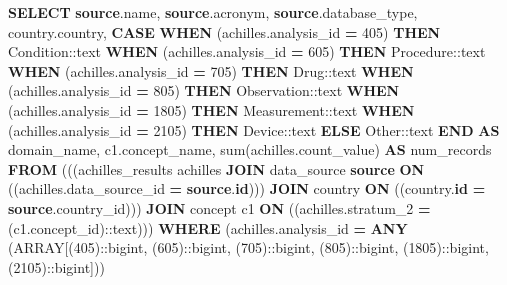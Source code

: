 \documentclass[
]{book}
\newenvironment{Shaded}{\begin{snugshade}}{\end{snugshade}}
\newcommand{\CharTok}[1]{\textcolor[rgb]{0.31,0.60,0.02}{#1}}
\newcommand{\ControlFlowTok}[1]{\textcolor[rgb]{0.13,0.29,0.53}{\textbf{#1}}}
\newcommand{\DataTypeTok}[1]{\textcolor[rgb]{0.13,0.29,0.53}{#1}}
\newcommand{\DecValTok}[1]{\textcolor[rgb]{0.00,0.00,0.81}{#1}}
\newcommand{\FunctionTok}[1]{\textcolor[rgb]{0.00,0.00,0.00}{#1}}
\newcommand{\KeywordTok}[1]{\textcolor[rgb]{0.13,0.29,0.53}{\textbf{#1}}}
\newcommand{\NormalTok}[1]{#1}
\newcommand{\OperatorTok}[1]{\textcolor[rgb]{0.81,0.36,0.00}{\textbf{#1}}}
\newcommand{\StringTok}[1]{\textcolor[rgb]{0.31,0.60,0.02}{#1}}
\begin{document}
\begin{Shaded}
\begin{Highlighting}[]
\KeywordTok{SELECT} \KeywordTok{source}\NormalTok{.name,}
   \KeywordTok{source}\NormalTok{.acronym,}
   \KeywordTok{source}\NormalTok{.database\_type,}
\NormalTok{   country.country,}
       \ControlFlowTok{CASE}
           \ControlFlowTok{WHEN}\NormalTok{ (achilles.analysis\_id }\OperatorTok{=} \DecValTok{405}\NormalTok{) }\ControlFlowTok{THEN} \StringTok{\textquotesingle{}Condition\textquotesingle{}}\NormalTok{:}\CharTok{:text}
           \ControlFlowTok{WHEN}\NormalTok{ (achilles.analysis\_id }\OperatorTok{=} \DecValTok{605}\NormalTok{) }\ControlFlowTok{THEN} \StringTok{\textquotesingle{}Procedure\textquotesingle{}}\NormalTok{:}\CharTok{:text}
           \ControlFlowTok{WHEN}\NormalTok{ (achilles.analysis\_id }\OperatorTok{=} \DecValTok{705}\NormalTok{) }\ControlFlowTok{THEN} \StringTok{\textquotesingle{}Drug\textquotesingle{}}\NormalTok{:}\CharTok{:text}
           \ControlFlowTok{WHEN}\NormalTok{ (achilles.analysis\_id }\OperatorTok{=} \DecValTok{805}\NormalTok{) }\ControlFlowTok{THEN} \StringTok{\textquotesingle{}Observation\textquotesingle{}}\NormalTok{:}\CharTok{:text}
           \ControlFlowTok{WHEN}\NormalTok{ (achilles.analysis\_id }\OperatorTok{=} \DecValTok{1805}\NormalTok{) }\ControlFlowTok{THEN} \StringTok{\textquotesingle{}Measurement\textquotesingle{}}\NormalTok{:}\CharTok{:text}
           \ControlFlowTok{WHEN}\NormalTok{ (achilles.analysis\_id }\OperatorTok{=} \DecValTok{2105}\NormalTok{) }\ControlFlowTok{THEN} \StringTok{\textquotesingle{}Device\textquotesingle{}}\NormalTok{:}\CharTok{:text}
           \ControlFlowTok{ELSE} \StringTok{\textquotesingle{}Other\textquotesingle{}}\NormalTok{:}\CharTok{:text}
       \ControlFlowTok{END} \KeywordTok{AS}\NormalTok{ domain\_name,}
\NormalTok{   c1.concept\_name,}
   \FunctionTok{sum}\NormalTok{(achilles.count\_value) }\KeywordTok{AS}\NormalTok{ num\_records}
  \KeywordTok{FROM}\NormalTok{ (((achilles\_results achilles}
    \KeywordTok{JOIN}\NormalTok{ data\_source }\KeywordTok{source} \KeywordTok{ON}\NormalTok{ ((achilles.data\_source\_id }\OperatorTok{=} \KeywordTok{source}\NormalTok{.}\KeywordTok{id}\NormalTok{)))}
    \KeywordTok{JOIN}\NormalTok{ country }\KeywordTok{ON}\NormalTok{ ((country.}\KeywordTok{id} \OperatorTok{=} \KeywordTok{source}\NormalTok{.country\_id)))}
    \KeywordTok{JOIN}\NormalTok{ concept c1 }\KeywordTok{ON}\NormalTok{ ((achilles.stratum\_2 }\OperatorTok{=}\NormalTok{ (c1.concept\_id):}\CharTok{:text}\NormalTok{)))}
 \KeywordTok{WHERE}\NormalTok{ (achilles.analysis\_id }\OperatorTok{=} \KeywordTok{ANY}\NormalTok{ (}\DataTypeTok{ARRAY}\NormalTok{[(}\DecValTok{405}\NormalTok{):}\CharTok{:bigint}\NormalTok{, (}\DecValTok{605}\NormalTok{):}\CharTok{:bigint}\NormalTok{, (}\DecValTok{705}\NormalTok{):}\CharTok{:bigint}\NormalTok{, (}\DecValTok{805}\NormalTok{):}\CharTok{:bigint}\NormalTok{, (}\DecValTok{1805}\NormalTok{):}\CharTok{:bigint}\NormalTok{, (}\DecValTok{2105}\NormalTok{):}\CharTok{:bigint}\NormalTok{]))}

\end{Highlighting}
\end{Shaded}
\end{document}
